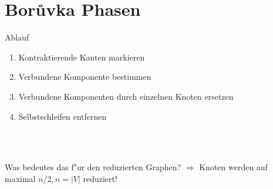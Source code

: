 \documentclass[10pt]{beamer}
\newcommand{\gap}{\ \\ \ \\}
\begin{document}
\section{Bor\r uvka Phasen}
\begin{frame}{Ablauf}
    \begin{enumerate}
        \item Kontraktierende Kanten markieren
        \item Verbundene Komponente bestimmen
        \item Verbundene Komponenten durch einzelnen Knoten ersetzen
        \item Selbstschleifen entfernen
    \end{enumerate}
    \gap
    \begin{block}{Was bedeutes das f"ur den reduzierten Graphen?}
    $\Rightarrow$ Knoten werden auf maximal $n/2, n = |V|$ reduziert!\\
    \end{block}
\end{frame}
\end{document}
